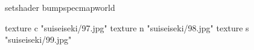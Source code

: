 setshader bumpspecmapworld

    texture c "suiseiseki/97.jpg"
    texture n "suiseiseki/98.jpg"
    texture s "suiseiseki/99.jpg"

